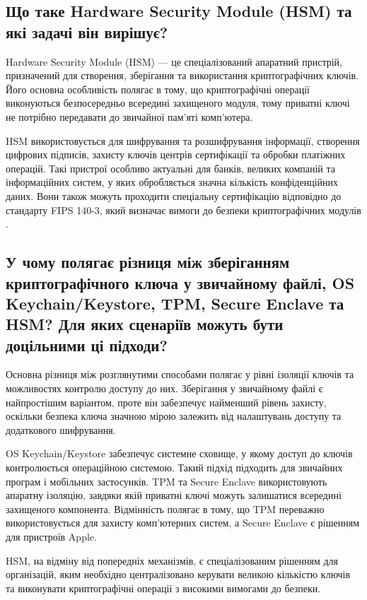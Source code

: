 \subsection{Що таке Hardware Security Module (HSM) та які задачі він вирішує?}

Hardware Security Module (HSM) — це спеціалізований апаратний пристрій, призначений для створення, 
зберігання та використання криптографічних ключів. Його основна особливість полягає в тому, 
що криптографічні операції виконуються безпосередньо всередині захищеного модуля, тому приватні ключі не 
потрібно передавати до звичайної пам'яті комп'ютера.

HSM використовується для шифрування та розшифрування інформації, створення цифрових підписів, 
захисту ключів центрів сертифікації та обробки платіжних операцій. Такі пристрої особливо актуальні 
для банків, великих компаній та інформаційних систем, у яких обробляється значна кількість конфіденційних даних. 
Вони також можуть проходити спеціальну сертифікацію відповідно до стандарту FIPS 140-3, який визначає вимоги до безпеки криптографічних модулів \cite{awshsm,nistfips}.

\subsection{У чому полягає різниця між зберіганням криптографічного ключа у звичайному файлі, OS Keychain/Keystore, TPM, Secure Enclave та HSM? Для яких сценаріїв можуть бути доцільними ці підходи?}

Основна різниця між розглянутими способами полягає у рівні ізоляції ключів та можливостях 
контролю доступу до них. Зберігання у звичайному файлі є найпростішим варіантом, проте він забезпечує 
найменший рівень захисту, оскільки безпека ключа значною мірою залежить від налаштувань доступу та додаткового шифрування.

OS Keychain/Keystore забезпечує системне сховище, у якому доступ до ключів контролюється операційною системою. 
Такий підхід підходить для звичайних програм і мобільних застосунків. TPM та Secure Enclave використовують апаратну ізоляцію, 
завдяки якій приватні ключі можуть залишатися всередині захищеного компонента. Відмінність полягає в тому, 
що TPM переважно використовується для захисту комп'ютерних систем, а Secure Enclave є рішенням для пристроїв Apple.

HSM, на відміну від попередніх механізмів, є спеціалізованим рішенням для організацій, яким необхідно централізовано 
керувати великою кількістю ключів та виконувати криптографічні операції з високими вимогами до безпеки.

